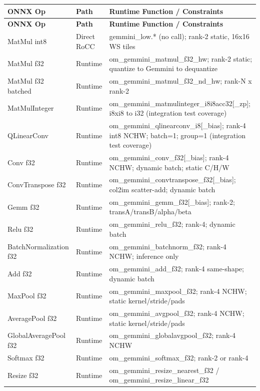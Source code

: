 \documentclass[12pt,a4paper]{article}
\begin{document}
\begin{longtable}{|p{}|p{}|p{}|}
\hline
\textbf{ONNX Op} & \textbf{Path} & \textbf{Runtime Function / Constraints} \\
\hline
\endfirsthead
\hline
\textbf{ONNX Op} & \textbf{Path} & \textbf{Runtime Function / Constraints} \\
\hline
\endhead
MatMul int8 & Direct RoCC & gemmini\_low.* (no call); rank-2 static, 16x16 WS tiles \\
\hline
MatMul f32 & Runtime & om\_gemmini\_matmul\_f32\_hw; rank-2 static; quantize to Gemmini to dequantize \\
\hline
MatMul f32 batched & Runtime & om\_gemmini\_matmul\_f32\_nd\_hw; rank-N x rank-2 \\
\hline
MatMulInteger & Runtime & om\_gemmini\_matmulinteger\_i8i8acc32[\_zp]; i8xi8 to i32 (integration test coverage) \\
\hline
QLinearConv & Runtime & om\_gemmini\_qlinearconv\_i8[\_bias]; rank-4 int8 NCHW; batch=1; group=1 (integration test coverage) \\
\hline
Conv f32 & Runtime & om\_gemmini\_conv\_f32[\_bias]; rank-4 NCHW; dynamic batch; static C/H/W \\
\hline
ConvTranspose f32 & Runtime & om\_gemmini\_convtranspose\_f32[\_bias]; col2im scatter-add; dynamic batch \\
\hline
Gemm f32 & Runtime & om\_gemmini\_gemm\_f32[\_bias]; rank-2; transA/transB/alpha/beta \\
\hline
Relu f32 & Runtime & om\_gemmini\_relu\_f32; rank-4; dynamic batch \\
\hline
BatchNormalization f32 & Runtime & om\_gemmini\_batchnorm\_f32; rank-4 NCHW; inference only \\
\hline
Add f32 & Runtime & om\_gemmini\_add\_f32; rank-4 same-shape; dynamic batch \\
\hline
MaxPool f32 & Runtime & om\_gemmini\_maxpool\_f32; rank-4 NCHW; static kernel/stride/pads \\
\hline
AveragePool f32 & Runtime & om\_gemmini\_avgpool\_f32; rank-4 NCHW; static kernel/stride/pads \\
\hline
GlobalAveragePool f32 & Runtime & om\_gemmini\_globalavgpool\_f32; rank-4 NCHW \\
\hline
Softmax f32 & Runtime & om\_gemmini\_softmax\_f32; rank-2 or rank-4 \\
\hline
Resize f32 & Runtime & om\_gemmini\_resize\_nearest\_f32 / om\_gemmini\_resize\_linear\_f32 \\

\end{longtable}
\end{document}
